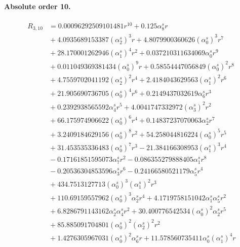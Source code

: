 \documentclass[10pt]{article}
\begin{document}
\paragraph{Absolute order 10.}
\begin{align*}
R_{3,10} &= 0.00096292509101481 r^{10} + 0.125 \alpha_{8}^s r \\
&{}  + 4.0935689153387 \left(\alpha_{2}^s\right)^{3} r + 4.8079900360626 \left(\alpha_{0}^s\right)^{3} r^{7} \\
&{}  + 28.170001262946 \left(\alpha_{1}^s\right)^{4} r^{2} + 0.037210311634069 \alpha_{0}^s r^{9} \\
&{}  + 0.011049369381434 \left(\alpha_{0}^s\right)^{9} r + 0.58554447056849 \left(\alpha_{0}^s\right)^{2} r^{8} \\
&{}  + 4.7559702041192 \left(\alpha_{2}^s\right)^{2} r^{4} + 2.4184043629563 \left(\alpha_{1}^s\right)^{2} r^{6} \\
&{}  + 21.905690736705 \left(\alpha_{0}^s\right)^{4} r^{6} + 0.2149437032619 \alpha_{6}^s r^{3} \\
&{}  + 0.2392938565592 \alpha_{4}^s r^{5} + 4.0041747332972 \left(\alpha_{3}^s\right)^{2} r^{2} \\
&{}  + 66.175974906622 \left(\alpha_{0}^s\right)^{6} r^{4} + 0.14837237070063 \alpha_{2}^s r^{7} \\
&{}  + 3.2409184629156 \left(\alpha_{0}^s\right)^{8} r^{2} + 54.258044816224 \left(\alpha_{0}^s\right)^{5} r^{5} \\
&{}  + 31.453535336483 \left(\alpha_{0}^s\right)^{7} r^{3} - 21.384166308953 \left(\alpha_{1}^s\right)^{3} r^{4} \\
&{}  - 0.17161851595073 \alpha_{7}^s r^{2} - 0.086355279888405 \alpha_{1}^s r^{8} \\
&{}  - 0.20536304853596 \alpha_{3}^s r^{6} - 0.24166580521179 \alpha_{5}^s r^{4} \\
&{}  + 434.7513127713 \left(\alpha_{0}^s\right)^{3} \left(\alpha_{1}^s\right)^{2} r^{3} \\
&{}  + 110.69159557962 \left(\alpha_{0}^s\right)^{3} \alpha_{2}^s r^{4} + 4.1719758151042 \alpha_{1}^s \alpha_{5}^s r^{2} \\
&{}  + 6.8286791143162 \alpha_{2}^s \alpha_{4}^s r^{2} + 30.400776542534 \left(\alpha_{0}^s\right)^{2} \alpha_{2}^s r^{5} \\
&{}  + 85.885091704801 \left(\alpha_{0}^s\right)^{2} \left(\alpha_{2}^s\right)^{2} r^{2} \\
&{}  + 1.4276305967031 \left(\alpha_{0}^s\right)^{2} \alpha_{6}^s r + 11.578560735411 \alpha_{0}^s \left(\alpha_{1}^s\right)^{4} r \\

\end{align*}
\end{document}
